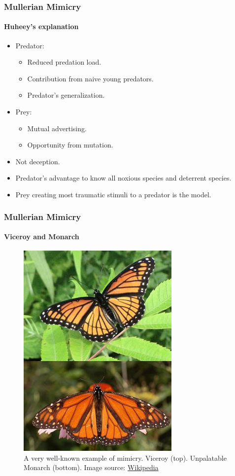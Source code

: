 \frame
{
	\frametitle{Mullerian Mimicry}
	\framesubtitle{Huheey's explanation}
	
	\begin{itemize}
		\item Predator:
			\begin{itemize}
				\item Reduced predation load.
				\item Contribution from naive young predators.
				\item Predator's generalization.
			\end{itemize}
		\item Prey:
			\begin{itemize}
				\item Mutual advertising.
				\item Opportunity from mutation.
			\end{itemize}
	\end{itemize}
	
	\begin{itemize}
		\item Not deception.
		\item Predator's advantage to know all noxious species and deterrent species.
		\item Prey creating most traumatic stimuli to a predator is the model.
	\end{itemize}
}

\frame
{
	\frametitle{Mullerian Mimicry}
	\framesubtitle{Viceroy and Monarch}

	\begin{figure}[H]
		\centering
		\includegraphics[scale=0.5]{../tex/images/BatesMimButter}
		\caption{A very well-known example of mimicry. Viceroy (top). Unpalatable Monarch (bottom). Image source: \href{http://en.wikipedia.org/wiki/Mullerian_mimicry}{Wikipedia}}
		\label{fig:mullerian-butterfly}
	\end{figure}

}

